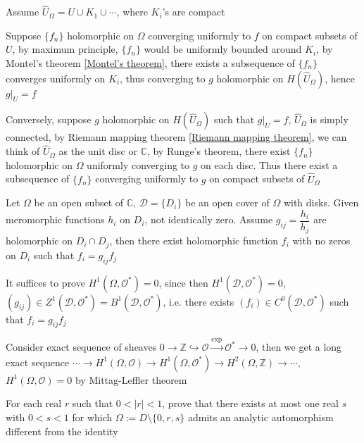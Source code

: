 \documentclass[main]{subfiles}
\begin{document}
\begin{solution}
Assume $\widehat U_\Omega=U\cup K_1\cup\cdots$, where $K_i$'s are compact \par
Suppose $\{f_n\}$ holomorphic on $\Omega$ converging uniformly to $f$ on compact subsets of $U$, by maximum principle, $\{f_n\}$ would be uniformly bounded around $K_i$, by Montel's theorem \ref{Montel's theorem}, there exists a subsequence of $\{f_n\}$ converges uniformly on $K_i$, thus converging to $g$ holomorphic on $H(\widehat U_\Omega)$, hence $g|_U=f$ \par
Conversely, suppose $g$ holomorphic on $H(\widehat U_\Omega)$ such that $g|_U=f$, $\widehat U_\Omega$ is simply connected, by Riemann mapping theorem \ref{Riemann mapping theorem}, we can think of $\widehat U_\Omega$ as the unit disc or $\mathbb C$, by Runge's theorem, there exist $\{f_n\}$ holomorphic on $\Omega$ uniformly converging to $g$ on each disc. Thus there exist a subsequence of $\{f_n\}$ converging uniformly to $g$ on compact subsets of $\widehat U_\Omega$
\end{solution}

\begin{exercise}
Let $\Omega$ be an open subset of $\mathbb C$, $\mathscr D=\{D_i\}$ be an open cover of $\Omega$ with disks. Given meromorphic functions $h_i$ on $D_i$, not identically zero. Assume $g_{ij}=\dfrac{h_i}{h_j}$ are holomorphic on $D_i\cap D_j$, then there exist holomorphic function $f_i$ with no zeros on $D_i$ such that $f_i=g_{ij}f_j$
\end{exercise}

\begin{solution}
It suffices to prove $H^1(\Omega,\mathcal{O}^*)=0$, since then $H^1(\mathscr D,\mathcal{O}^*)=0$, $(g_{ij})\in Z^1(\mathscr D,\mathcal O^*)=B^1(\mathscr D,\mathcal O^*)$, i.e. there exists $(f_i)\in C^0(\mathscr D,\mathcal O^*)$ such that $f_i=g_{ij}f_j$ \par
Consider exact sequence of sheaves $0\to\mathbb Z\hookrightarrow\mathcal O\xrightarrow{\exp}\mathcal O^*\to0$, then we get a long exact sequence $\cdots\to H^1(\Omega,\mathcal O)\to H^1(\Omega,\mathcal O^*)\to H^2(\Omega,\mathbb Z)\to\cdots$, $H^1(\Omega,\mathcal O)=0$ by Mittag-Leffler theorem
\end{solution}

\begin{exercise}
For each real $r$ such that $0<|r|<1$, prove that there exists at most one real $s$ with $0<s<1$ for which $\Omega:=D\setminus\{0,r,s\}$ admits an analytic automorphism different from the identity
\end{exercise}
\end{document}
